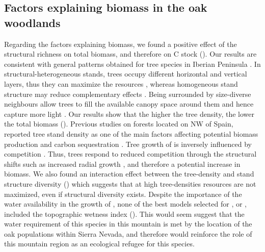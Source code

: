 \subsection{Factors explaining biomass in the oak woodlands}\label{sec:carbon:discussion-factors}
Regarding the factors explaining biomass, we found a positive effect of the structural richness on total biomass, and therefore on C stock (). Our results are consistent with general patterns obtained for tree species in Iberian Peninsula \autocite{Vayredaetal2012SpatialPatterns}. In structural-heterogeneous stands, trees occupy different horizontal and vertical layers, thus they can maximize the resources \autocite[\emph{e.g.} light][]{Forrester2014StandlevelLight}, whereas homogeneous stand structure may reduce complementary effects \autocite{Goncalves2018EffectsForest,Vayredaetal2012SpatialPatterns}. Being surrounded by size-diverse neighbours allow trees to fill the available canopy space around them and hence capture more light \autocite{Forrester2014StandlevelLight,Vanhellemontetal2018SpeciesStructural}. Our results show that the higher the tree density, the lower the total biomass ().
Previous studies on forests located on NW of Spain, reported tree stand density as one of the main factors affecting potential biomass production and carbon sequestration \autocite{CastanoSantamariaetal2013PotentialGround}. Tree growth of \Qp is inversely influenced by competition \autocite{Canellasetal2004GrowthResponse,FernandezdeUnaetal2015StandCompetition,FernandezdeUnaetal2016DisentanglingEffect}. Thus, trees respond to reduced competition through the structural shifts such as increased radial growth \autocite{Canellasetal2004GrowthResponse,FernandezdeUnaetal2016DisentanglingEffect}, and therefore a potential increase in biomass. We also found an interaction effect between the tree-density and stand structure diversity () which suggests that at high tree-densities resources are not maximized, even if structural diversity exists.
Despite the importance of the water availability in the growth of \Qp \autocite{GeaIzquierdoCanellas2014LocalClimate,MorenoFernandezetal2020InfluenceClimate}, none of the best models selected for \wt, \ws or \wro, included the topographic wetness index (). This would seem suggest that the water requirement of this species in this mountain is met by the location of the oak populations within Sierra Nevada, and therefore would reinforce the role of this mountain region as an ecological refugee for this species.

